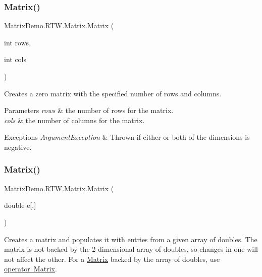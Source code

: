 \subsubsection{\texorpdfstring{Matrix()}{Matrix()}\hspace{0.1cm}{\footnotesize\ttfamily [1/2]}}
{\footnotesize\ttfamily Matrix\+Demo.\+R\+T\+W.\+Matrix.\+Matrix (\begin{DoxyParamCaption}\item[{int}]{rows,  }\item[{int}]{cols }\end{DoxyParamCaption})}



Creates a zero matrix with the specified number of rows and columns. 


\begin{DoxyParams}{Parameters}
{\em rows} & the number of rows for the matrix.\\
\hline
{\em cols} & the number of columns for the matrix.\\
\hline
\end{DoxyParams}

\begin{DoxyExceptions}{Exceptions}
{\em Argument\+Exception} & Thrown if either or both of the dimensions is negative.\\
\hline
\end{DoxyExceptions}
\mbox{\label{class_matrix_demo_1_1_r_t_w_1_1_matrix_ad2a320fd0c86551f34070679fd43433c}} 
\subsubsection{\texorpdfstring{Matrix()}{Matrix()}\hspace{0.1cm}{\footnotesize\ttfamily [2/2]}}
{\footnotesize\ttfamily Matrix\+Demo.\+R\+T\+W.\+Matrix.\+Matrix (\begin{DoxyParamCaption}\item[{double}]{e\mbox{[},\mbox{]} }\end{DoxyParamCaption})}



Creates a matrix and populates it with entries from a given array of doubles. The matrix is not backed by the 2-\/dimensional array of doubles, so changes in one will not affect the other. For a \mbox{\hyperlink{class_matrix_demo_1_1_r_t_w_1_1_matrix}{Matrix}} backed by the array of doubles, use \mbox{\hyperlink{class_matrix_demo_1_1_r_t_w_1_1_matrix_a0c737f7e6b54edac4d26b4f1c595ee92}{operator Matrix}}. 


